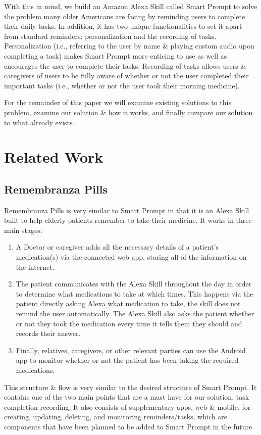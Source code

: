 \documentclass[11pt, oneside]{article}
\begin{document}
With this in mind, we build an Amazon Alexa Skill called Smart Prompt to solve the problem many older Americans are facing by reminding users to complete their daily tasks. 
In addition, it has two unique functionalities to set it apart from standard reminders: personalization and the recording of tasks. 
Personalization (i.e., referring to the user by name \& playing custom audio upon completing a task) makes Smart Prompt more enticing to use as well as encourages the user to complete their tasks. 
Recording of tasks allows users \& caregivers of users to be fully aware of whether or not the user completed their important tasks (i.e., whether or not the user took their morning medicine). 

For the remainder of this paper we will examine existing solutions to this problem, examine our solution \& how it works, and finally compare our solution to what already exists. 


\section{Related Work}

\subsection{Remembranza Pills}
Remembranza Pills \cite{b2} is very similar to Smart Prompt in that it is an Alexa Skill built to help elderly patients remember to take their medicine. 
It works in three main stages: 
\begin{enumerate}
  \item A Doctor or caregiver adds all the necessary details of a patient's medication(s) via the connected web app, storing all of the information on the internet.
  \item The patient communicates with the Alexa Skill throughout the day in order to determine what medications to take at which times. This happens via the patient directly asking Alexa what medication to take, the skill does not remind the user automatically. The Alexa Skill also asks the patient whether or not they took the medication every time it tells them they should and records their answer.
  \item Finally, relatives, caregivers, or other relevant parties can use the Android app to monitor whether or not the patient has been taking the required medications. 
\end{enumerate}

This structure \& flow is very similar to the desired structure of Smart Prompt. 
It contains one of the two main points that are a must have for our solution, task completion recording. 
It also consists of supplementary apps, web \& mobile, for creating, updating, deleting, and monitoring reminders/tasks, which are components that have been planned to be added to Smart Prompt in the future. 
\end{document}
